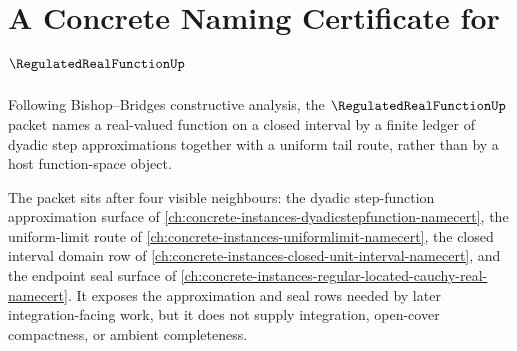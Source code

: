\chapter{A Concrete Naming Certificate for $\RegulatedRealFunctionUp$}
\label{ch:concrete-instances-regulatedrealfunction-namecert}

Following Bishop--Bridges constructive analysis, the $\RegulatedRealFunctionUp$ packet names a real-valued function on a closed interval by a finite ledger of dyadic step approximations together with a uniform tail route, rather than by a host function-space object.

The packet sits after four visible neighbours: the dyadic step-function approximation surface of \autoref{ch:concrete-instances-dyadicstepfunction-namecert}, the uniform-limit route of \autoref{ch:concrete-instances-uniformlimit-namecert}, the closed interval domain row of \autoref{ch:concrete-instances-closed-unit-interval-namecert}, and the endpoint seal surface of \autoref{ch:concrete-instances-regular-located-cauchy-real-namecert}. It exposes the approximation and seal rows needed by later integration-facing work, but it does not supply integration, open-cover compactness, or ambient completeness.


